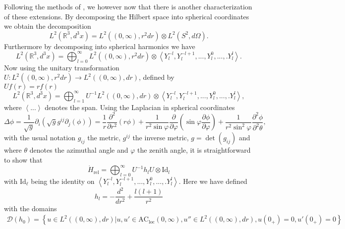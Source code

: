 \documentclass[a4paper,11pt]{article}
\newcommand{\dom}[1]{\mathscr D\left(#1\right)}
\renewcommand{\braket}[1]{\left\langle#1\right\rangle}
\newcommand{\R}{\mathbb{R}}
\numberwithin{equation}{section}
\begin{document}
Following the methods of \cite{albeverio2012solvable}, we however now that there is another characterization of these extensions. By decomposing the Hilbert space into spherical coordinates we obtain the decomposition \begin{equation}
L^2(\R^3,d^3x)=L^2((0,\infty),r^2dr)\otimes L^2(S^2,d\Omega).
\end{equation}
Furthermore by decomposing into spherical harmonics we have \begin{equation}
L^2(\R^3,d^3x)=\bigoplus_{l=0}^{\infty}L^2((0,\infty),r^2dr)\otimes \braket{Y_l^{-l},Y_l^{-l+1},...,Y_l^0,...,.Y_l^l}.
\end{equation}
Now using the unitary transformation $ U:L^2((0,\infty),r^2dr)\to L^2((0,\infty),dr) $, defined by\\ $ Uf(r)=rf(r) $
\begin{equation}
L^2(\R^3,d^3x)=\bigoplus_{l=1}^{\infty}U^{-1}L^2((0,\infty),dr)\otimes \braket{Y_l^{-l},Y_l^{-l+1},...,Y_l^0,...,.Y_l^l},
\end{equation}
where $ \braket{...} $ denotes the span. Using the Laplacian in spherical coordinates \begin{equation}
\Delta\phi=\frac{1}{\sqrt{g}}\partial_i(\sqrt{g}g^{ij}\partial_j(\phi))=\frac{1}{r}\frac{\partial^2}{\partial r^2}(r\phi)+\frac{1}{r^2\sin\varphi}\frac{\partial}{\partial\varphi}(\sin\varphi\frac{\partial\phi}{\partial\varphi})+\frac{1}{r^2\sin^2\varphi}\frac{\partial^2\phi}{\partial^2\theta},
\end{equation} with the usual notation $ g_{ij} $ the metric, $ g^{ij} $ the inverse metric, $ g=\det(g_{ij}) $ and where $ \theta $ denotes the azimuthal angle and $ \varphi $ the zenith angle, it is straightforward to show that\begin{equation}
\dot{H}_{\text{rel}}=\bigoplus_{l=0}^{\infty}U^{-1}h_lU\otimes\text{Id}_{l}
\end{equation}
with $ \text{Id}_\ell $ being the identity on $ \braket{Y_l^{-l},Y_l^{-l+1},...,Y_l^0,...,.Y_l^l} $. Here we have defined \begin{equation}
h_l=-\frac{d^2}{dr^2}+\frac{l(l+1)}{r^2}
\end{equation}
with the domains\begin{equation}
\begin{aligned}\dom{h_0}=\left\{u\in L^2((0,\infty),dr)|u,u'\in\text{AC}_{\text{loc}}(0,\infty),u''\in L^2((0,\infty),dr), u(0_+)=0, u'(0_+)=0\right\}
\end{aligned}
\end{equation}
\end{document}
